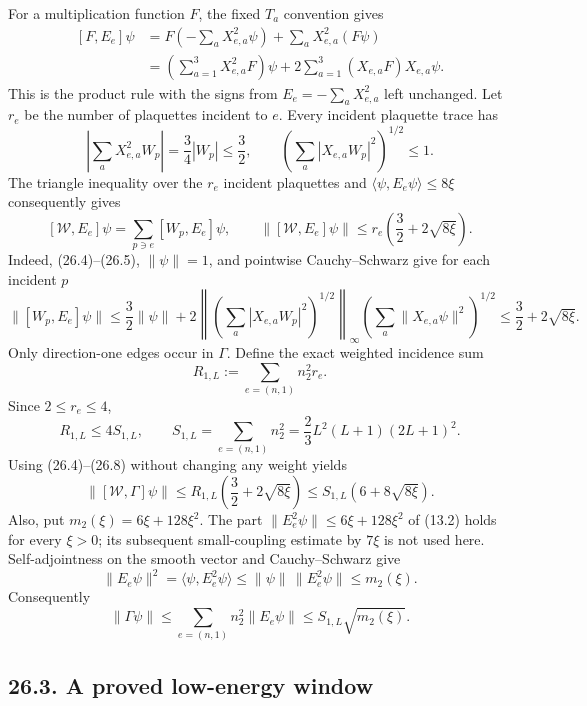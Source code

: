 \documentclass[
]{article}
\begin{document}
For a multiplication function \(F\), the fixed \(T_a\) convention gives
\[
 \begin{aligned}
 [F,E_e]\psi
 &=F\left(-\sum_aX_{e,a}^2\psi\right)
   +\sum_aX_{e,a}^2(F\psi)\\
 &=\left(\sum_{a=1}^3X_{e,a}^2F\right)\psi
 +2\sum_{a=1}^3(X_{e,a}F)X_{e,a}\psi .
 \end{aligned}
 \tag{26.4}
\] This is the product rule with the signs from \(E_e=-\sum_aX_{e,a}^2\)
left unchanged. Let \(r_e\) be the number of plaquettes incident to
\(e\). Every incident plaquette trace has \[
 \left|\sum_aX_{e,a}^2W_p\right|
 =\frac34|W_p|\le\frac32,\qquad
 \left(\sum_a|X_{e,a}W_p|^2\right)^{1/2}\le1 .
 \tag{26.5}
\] The triangle inequality over the \(r_e\) incident plaquettes and
\(\langle\psi,E_e\psi\rangle\le8\xi\) consequently gives \[
 [\mathcal W,E_e]\psi
 =\sum_{p\ni e}[W_p,E_e]\psi,
 \qquad
 \|[\mathcal W,E_e]\psi\|
 \le r_e\left(\frac32+2\sqrt{8\xi}\right).
 \tag{26.6}
\] Indeed, (26.4)--(26.5), \(\|\psi\|=1\), and pointwise Cauchy--Schwarz
give for each incident \(p\) \[
 \|[W_p,E_e]\psi\|
 \le \frac32\|\psi\|+
 2\left\|\left(\sum_a|X_{e,a}W_p|^2\right)^{1/2}\right\|_\infty
    \left(\sum_a\|X_{e,a}\psi\|^2\right)^{1/2}
 \le \frac32+2\sqrt{8\xi}.
\] Only direction-one edges occur in \(\Gamma\). Define the exact
weighted incidence sum \[
 R_{1,L}:=\sum_{e=(n,1)}n_2^2r_e .
 \tag{26.7}
\] Since \(2\le r_e\le4\), \[
 R_{1,L}\le4S_{1,L},\qquad
 S_{1,L}=\sum_{e=(n,1)}n_2^2
 =\frac23L^2(L+1)(2L+1)^2 .
 \tag{26.8}
\] Using (26.4)--(26.8) without changing any weight yields \[
 \|[\mathcal W,\Gamma]\psi\|
 \le R_{1,L}\left(\frac32+2\sqrt{8\xi}\right)
 \le S_{1,L}\left(6+8\sqrt{8\xi}\right).
 \tag{26.9}
\] Also, put \(m_2(\xi)=6\xi+128\xi^2\). The part
\(\|E_e^2\psi\|\le6\xi+128\xi^2\) of (13.2) holds for every \(\xi>0\);
its subsequent small-coupling estimate by \(7\xi\) is not used here.
Self-adjointness on the smooth vector and Cauchy--Schwarz give \[
\|E_e\psi\|^2
=\langle\psi,E_e^2\psi\rangle
\le\|\psi\|\,\|E_e^2\psi\|\le m_2(\xi).
\] Consequently \[
 \|\Gamma\psi\|
 \le\sum_{e=(n,1)}n_2^2\|E_e\psi\|
 \le S_{1,L}\sqrt{m_2(\xi)} .
 \tag{26.10}
\]

\subsection{26.3. A proved low-energy
window}\label{a-proved-low-energy-window}
\end{document}
